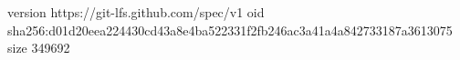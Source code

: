 version https://git-lfs.github.com/spec/v1
oid sha256:d01d20eea224430cd43a8e4ba522331f2fb246ac3a41a4a842733187a3613075
size 349692
